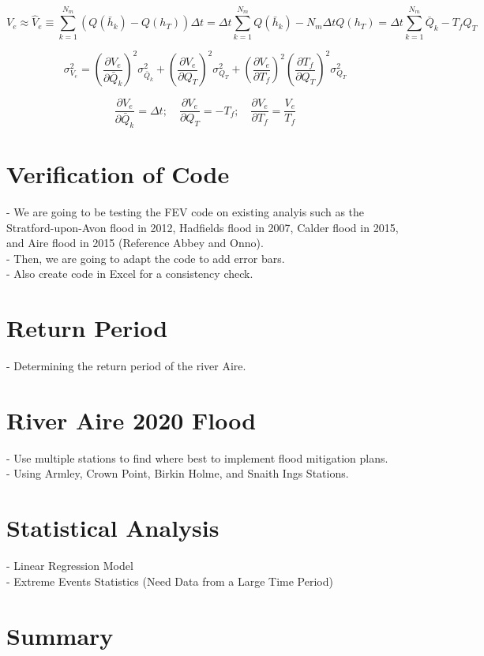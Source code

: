 \[V_{e}\approx \widehat{V}_{e}\equiv \sum_{k=1}^{N_{m}}\left(Q\left (\bar{h}_{k} \right )-Q\left (h_{T} \right ) \right )\Delta t=\Delta t\sum_{k=1}^{N_{m}} Q\left (\bar{h}_{k} \right )-N_{m}\Delta tQ\left ( h_{T} \right )= \Delta t\sum_{k=1}^{N_{m}}\bar{Q}_{k}-T_{f}Q_{T}\]


\[{\sigma_{V_e}^2} = (\frac{\partial V_e}{\partial\bar Q_k})^2{\sigma_{\bar Q_k}^2} + (\frac{\partial V_e}{\partial Q_T})^2{\sigma_{Q_T}^2}+(\frac{\partial V_e}{\partial T_f})^2(\frac{\partial T_f}{\partial Q_T})^2{\sigma_{Q_T}^2}\]


\[\frac{\partial V_e}{\partial\bar Q_k} = \Delta t;\quad  \frac{\partial V_e}{\partial Q_T} = -T_f;\quad  \frac{\partial V_e}{\partial T_f} = \frac{V_e}{T_f}\]


\section*{Verification of Code}
- We are going to be testing the FEV code on existing analyis such as the Stratford-upon-Avon flood in 2012, Hadfields flood in 2007, Calder flood in 2015, and Aire flood in 2015 (Reference Abbey and Onno). \\
- Then, we are going to adapt the code to add error bars. \\
- Also create code in Excel for a consistency check. \\

\section*{Return Period}
- Determining the return period of the river Aire. \\

\section*{River Aire 2020 Flood}
- Use multiple stations to find where best to implement flood mitigation plans. \\
- Using Armley, Crown Point, Birkin Holme, and Snaith Ings Stations.

\section*{Statistical Analysis}
- Linear Regression Model \\
- Extreme Events Statistics (Need Data from a Large Time Period)

\section*{Summary}
